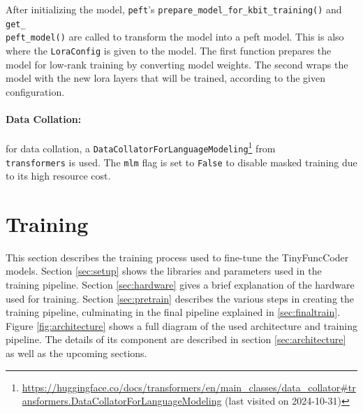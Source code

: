 After initializing the model, \texttt{peft}'s \texttt{prepare\_model\_for\_kbit\_training()} and \texttt{get\_\\peft\_model()} are called to transform the model into a \ac{peft} model.
This is also where the \texttt{LoraConfig} is given to the model.
The first function prepares the model for low-rank training by converting model weights.
The second wraps the model with the new \ac{lora} layers that will be trained, according to the given configuration.

\paragraph{Data Collation:}
for data collation, a \texttt{DataCollatorForLanguageModeling}\footnote{\url{https://huggingface.co/docs/transformers/en/main_classes/data_collator\#transformers.DataCollatorForLanguageModeling} (last visited on 2024-10-31)} from \\\texttt{transformers} is used.
The \texttt{mlm} flag is set to \texttt{False} to disable masked training due to its high resource cost.

\section{Training}
\label{sec:training}

This section describes the training process used to fine-tune the TinyFuncCoder models.
Section \ref{sec:setup} shows the libraries and parameters used in the training pipeline.
Section \ref{sec:hardware} gives a brief explanation of the hardware used for training.
Section \ref{sec:pretrain} describes the various steps in creating the training pipeline, culminating in the final pipeline explained in \ref{sec:finaltrain}.
Figure \ref{fig:architecture} shows a full diagram of the used architecture and training pipeline.
The details of its component are described in section \ref{sec:architecture} as well as the upcoming sections.

